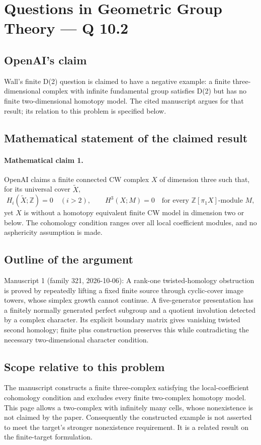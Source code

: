 \documentclass[11pt]{article}
\begin{document}
\section*{Questions in Geometric Group Theory — Q 10.2}

\subsection{OpenAI's claim}
Wall's finite D(2) question is claimed to have a negative example: a finite three-dimensional complex with infinite fundamental group satisfies D(2) but has no finite two-dimensional homotopy model. The cited manuscript argues for that result; its relation to this problem is specified below.

\subsection{Mathematical statement of the claimed result}
\paragraph{Mathematical claim 1.} OpenAI claims a finite connected CW complex $X$ of dimension three such that, for its universal cover $\widetilde X$,
\[
H_i(\widetilde X;\mathbb Z)=0\quad(i>2),\qquad
H^3(X;M)=0\quad\text{for every }\mathbb Z[\pi_1X]\text{-module }M,
\]
yet $X$ is without a homotopy equivalent finite CW model in dimension two or below. The cohomology condition ranges over all local coefficient modules, and no asphericity assumption is made.

\subsection{Outline of the argument}
Manuscript 1 (family 321, 2026-10-06): A rank-one twisted-homology obstruction is proved by repeatedly lifting a fixed finite source through cyclic-cover image towers, whose simplex growth cannot continue. A five-generator presentation has a finitely normally generated perfect subgroup and a quotient involution detected by a complex character. Its explicit boundary matrix gives vanishing twisted second homology; finite plus construction preserves this while contradicting the necessary two-dimensional character condition.

\subsection{Scope relative to this problem}
The manuscript constructs a finite three-complex satisfying the local-coefficient cohomology condition and excludes every finite two-complex homotopy model. This page allows a two-complex with infinitely many cells, whose nonexistence is not claimed by the paper. Consequently the constructed example is not asserted to meet the target's stronger nonexistence requirement. It is a related result on the finite-target formulation.
\end{document}
